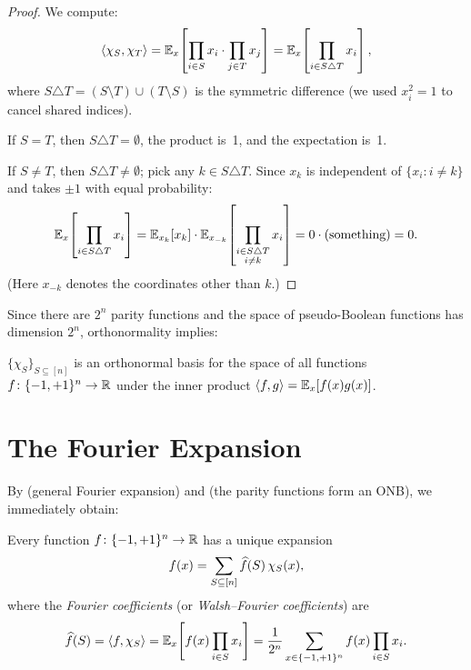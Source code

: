\begin{proof}
We compute:
\[
  \langle \chi_S, \chi_T \rangle
  = \mathbb{E}_x\!\left[\prod_{i \in S} x_i \cdot \prod_{j \in T} x_j\right]
  = \mathbb{E}_x\!\left[\prod_{i \in S \triangle T} x_i\right],
\]
where $S \triangle T = (S \setminus T) \cup (T \setminus S)$ is the
symmetric difference (we used $x_i^2 = 1$ to cancel shared indices).

If $S = T$, then $S \triangle T = \emptyset$, the product is~1, and the
expectation is~1.

If $S \neq T$, then $S \triangle T \neq \emptyset$; pick any
$k \in S \triangle T$. Since $x_k$ is independent of $\{x_i : i \neq k\}$
and takes $\pm 1$ with equal probability:
\[
  \mathbb{E}_x\!\left[\prod_{i \in S \triangle T} x_i\right]
  = \mathbb{E}_{x_k}[x_k] \cdot \mathbb{E}_{x_{-k}}\!\left[\prod_{\substack{i \in S \triangle T \\ i \neq k}} x_i\right]
  = 0 \cdot (\text{something}) = 0.
\]
(Here $x_{-k}$ denotes the coordinates other than $k$.)
\end{proof}

Since there are $2^n$ parity functions and the space of pseudo-Boolean
functions has dimension $2^n$, orthonormality implies:

\begin{corollary}\label{cor:parity-onb}
$\{\chi_S\}_{S \subseteq [n]}$ is an orthonormal basis for the space
of all functions $f \colon \{-1,+1\}^n \to \mathbb{R}$ under the inner product
$\langle f, g \rangle = \mathbb{E}_x[f(x)g(x)]$.
\end{corollary}


\section{The Fourier Expansion}\label{sec:fourier-expansion}

By  (general Fourier expansion) and
 (the parity functions form an ONB), we immediately
obtain:

\begin{theorem}\label{thm:fourier-expansion}
Every function $f \colon \{-1,+1\}^n \to \mathbb{R}$ has a unique expansion
\begin{equation}\label{eq:fourier-expansion}
  f(x) = \sum_{S \subseteq [n]} \widehat{f}(S)\, \chi_S(x),
\end{equation}
where the \emph{Fourier coefficients} (or \emph{Walsh--Fourier
coefficients}) are
\begin{equation}\label{eq:fourier-coeff}
  \widehat{f}(S) = \langle f, \chi_S \rangle
  = \mathbb{E}_x\!\left[f(x) \prod_{i \in S} x_i\right]
  = \frac{1}{2^n} \sum_{x \in \{-1,+1\}^n} f(x) \prod_{i \in S} x_i.
\end{equation}
\end{theorem}

